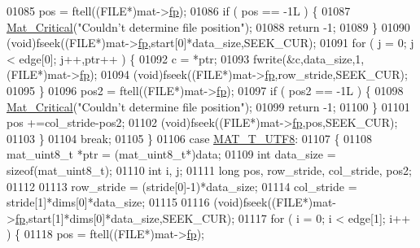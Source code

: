 \begin{DoxyCode}
{{{{01085                 pos = ftell((FILE*)mat->\hyperlink{struct__mat__t_a85f562e407ca9ad4d2a6e14f839432b7}{fp});
01086                 \textcolor{keywordflow}{if} ( pos == -1L ) \{
01087                     \hyperlink{group__mat__util_gaf51f2bfbb5580f575e4dd79757e2b80c}{Mat\_Critical}(\textcolor{stringliteral}{"Couldn't determine file position"});
01088                     \textcolor{keywordflow}{return} -1;
01089                 \}
01090                 (void)fseek((FILE*)mat->\hyperlink{struct__mat__t_a85f562e407ca9ad4d2a6e14f839432b7}{fp},start[0]*data\_size,SEEK\_CUR);
01091                 \textcolor{keywordflow}{for} ( j = 0; j < edge[0]; j++,ptr++ ) \{
01092                     c = *ptr;
01093                     fwrite(&c,data\_size,1,(FILE*)mat->\hyperlink{struct__mat__t_a85f562e407ca9ad4d2a6e14f839432b7}{fp});
01094                     (void)fseek((FILE*)mat->\hyperlink{struct__mat__t_a85f562e407ca9ad4d2a6e14f839432b7}{fp},row\_stride,SEEK\_CUR);
01095                 \}
01096                 pos2 = ftell((FILE*)mat->\hyperlink{struct__mat__t_a85f562e407ca9ad4d2a6e14f839432b7}{fp});
01097                 \textcolor{keywordflow}{if} ( pos2 == -1L ) \{
01098                     \hyperlink{group__mat__util_gaf51f2bfbb5580f575e4dd79757e2b80c}{Mat\_Critical}(\textcolor{stringliteral}{"Couldn't determine file position"});
01099                     \textcolor{keywordflow}{return} -1;
01100                 \}
01101                 pos +=col\_stride-pos2;
01102                 (void)fseek((FILE*)mat->\hyperlink{struct__mat__t_a85f562e407ca9ad4d2a6e14f839432b7}{fp},pos,SEEK\_CUR);
01103             \}
01104             \textcolor{keywordflow}{break};
01105         \}
01106         \textcolor{keywordflow}{case} \hyperlink{group___m_a_t_ggacf7b3b879282b7ab3a51190e49bf3453ac34ad81f5cbd3b7d0d95e57e5be0149b}{MAT\_T\_UTF8}:
01107         \{
01108             mat\_uint8\_t *ptr = (mat\_uint8\_t*)data;
01109             \textcolor{keywordtype}{int} data\_size = \textcolor{keyword}{sizeof}(mat\_uint8\_t);
01110             \textcolor{keywordtype}{int} i, j;
01111             \textcolor{keywordtype}{long} pos, row\_stride, col\_stride, pos2;
01112 
01113             row\_stride = (stride[0]-1)*data\_size;
01114             col\_stride = stride[1]*dims[0]*data\_size;
01115 
01116             (void)fseek((FILE*)mat->\hyperlink{struct__mat__t_a85f562e407ca9ad4d2a6e14f839432b7}{fp},start[1]*dims[0]*data\_size,SEEK\_CUR);
01117             \textcolor{keywordflow}{for} ( i = 0; i < edge[1]; i++ ) \{
01118                 pos = ftell((FILE*)mat->\hyperlink{struct__mat__t_a85f562e407ca9ad4d2a6e14f839432b7}{fp});
}}}}
\end{DoxyCode}
